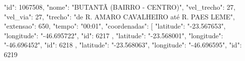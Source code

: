 {
    "id": 1067508,
    "nome": "BUTANTÃ (BAIRRO - CENTRO)",
    "vel_trecho": 27,
    "vel_via": 27,
    "trecho": "de R. AMARO CAVALHEIRO até R. PAES LEME",
        "extensao": 650,
        "tempo": "00:01",
        "coordenadas": [
            {
                "latitude": "-23.567653",
                "longitude": "-46.695722",
                "id": 6217
            },
            {
                "latitude": "-23.568001",
                "longitude": "-46.696452",
                "id": 6218
            },
            {
                "latitude": "-23.568063",
                "longitude": "-46.696595",
                "id": 6219
            }}